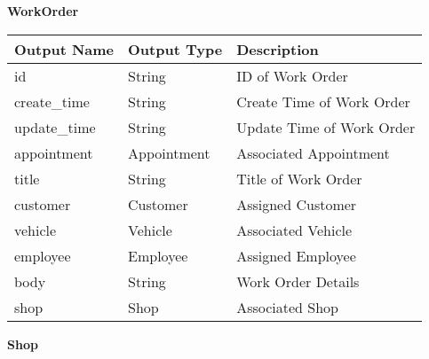 \documentclass[12pt, titlepage]{article}
\begin{document}
\textbf{WorkOrder}

\begin{table}[H]
	\begin{tabular}{|p{}|p{}|p{}|}
		\hline
		\textbf{Output Name} & \textbf{Output Type} & \textbf{Description}      \\
		\hline
		id                   & String               & ID of Work Order          \\
		\hline
		create\_time         & String               & Create Time of Work Order \\
		\hline
		update\_time         & String               & Update Time of Work Order \\
		\hline
		appointment          & Appointment          & Associated Appointment    \\
		\hline
		title                & String               & Title of Work Order       \\
		\hline
		customer             & Customer             & Assigned Customer         \\
		\hline
		vehicle              & Vehicle              & Associated Vehicle        \\
		\hline
		employee             & Employee             & Assigned Employee         \\
		\hline
		body                 & String               & Work Order Details        \\
		\hline
		shop                 & Shop                 & Associated Shop           \\
		\hline
	\end{tabular}
\end{table}

\textbf{Shop}
\end{document}
